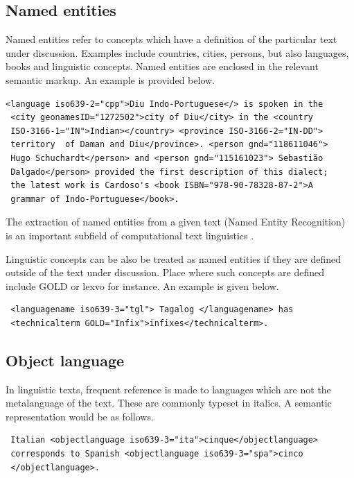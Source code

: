 \documentclass[a4paper,10pt]{article}
\begin{document}
\subsection{Named entities}
Named entities refer to concepts which have a definition of the particular text under discussion. Examples include countries, cities, persons, but also languages, books and linguistic concepts. Named entities are enclosed in the relevant semantic markup. An example is provided below.

\begin{verbatim}
<language iso639-2="cpp">Diu Indo-Portuguese</> is spoken in the
 <city geonamesID="1272502">city of Diu</city> in the <country
 ISO-3166-1="IN">Indian></country> <province ISO-3166-2="IN-DD">
 territory  of Daman and Diu</province>. <person gnd="118611046">
 Hugo Schuchardt</person> and <person gnd="115161023"> Sebastião
 Dalgado</person> provided the first description of this dialect;
 the latest work is Cardoso's <book ISBN="978-90-78328-87-2">A
 grammar of Indo-Portuguese</book>. 
\end{verbatim}
 
The extraction of named entities from a given text (Named Entity Recognition) is an important subfield of computational text linguistics \citep[e.g.][]{Borthwick1999}.

Linguistic concepts can be also be treated as named entities if they are defined outside of the text under discussion. Place where such concepts are defined include GOLD or lexvo for instance. An example is given below.

\begin{verbatim}
 <languagename iso639-3="tgl"> Tagalog </languagename> has
 <technicalterm GOLD="Infix">infixes</technicalterm>.
\end{verbatim}


\subsection{Object language}
In linguistic texts, frequent reference is made to languages which are not the metalanguage of the text. These are commonly typeset in italics. A semantic representation would be as follows.

\begin{verbatim}
 Italian <objectlanguage iso639-3="ita">cinque</objectlanguage>
 corresponds to Spanish <objectlanguage iso639-3="spa">cinco
 </objectlanguage>.
\end{verbatim}
\end{document}
